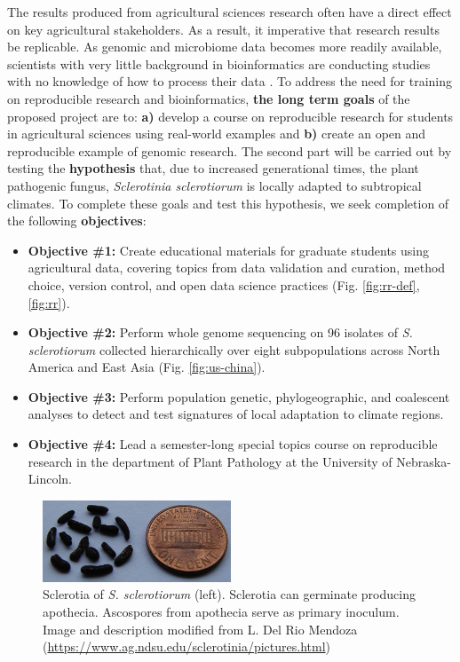 \documentclass[12pt,letterpaper]{article}
\begin{document}
The results produced from agricultural sciences research often have a direct effect on key agricultural stakeholders. 
As a result, it imperative that research results be replicable. 
As genomic and microbiome data becomes more readily available, scientists with very little background in bioinformatics are conducting studies with no knowledge of how to process their data \citep{stewart-lowndes2017path, barone2017unmet}. 
To address the need for training on reproducible research and bioinformatics, \textbf{the long term goals} of the proposed project are to: \textbf{a)} develop a course on reproducible research for students in agricultural sciences using real-world examples and \textbf{b)} create an open and reproducible example of genomic research. The second part will be carried out by testing the \textbf{hypothesis} that, due to increased generational times, the plant pathogenic fungus, \textit{Sclerotinia sclerotiorum} is locally adapted to subtropical climates.
To complete these goals and test this hypothesis, we seek completion of the following \textbf{objectives}:
\begin{itemize}
  \item \textbf{Objective \#1:} Create educational materials for graduate students using agricultural data, covering topics from data validation and curation, method choice, version control, and open data science practices (Fig. \ref{fig:rr-def}, \ref{fig:rr}).
  \item \textbf{Objective \#2:} Perform whole genome sequencing on 96 isolates of \textit{S. sclerotiorum} collected hierarchically over eight subpopulations across North America and East Asia (Fig. \ref{fig:us-china}).
  \item \textbf{Objective \#3:} Perform population genetic, phylogeographic, and coalescent analyses to detect and test signatures of local adaptation to climate regions.
  \item \textbf{Objective \#4:} Lead a semester-long special topics course on reproducible research in the department of Plant Pathology at the University of Nebraska-Lincoln.
\end{itemize}

\begin{figure}
  \centering
  \includegraphics[width=0.5\textwidth]{figure/sclerotia.jpg}
  \caption{Sclerotia of \textit{S. sclerotiorum} (left). Sclerotia can germinate producing apothecia. Ascospores from apothecia serve as primary inoculum. Image and description modified from L. Del Rio Mendoza (\url{https://www.ag.ndsu.edu/sclerotinia/pictures.html})}
  \label{fig:sclerotia}
\end{figure}
\end{document}
